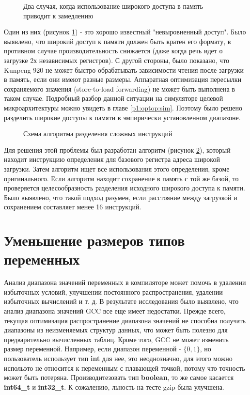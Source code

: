 \begin{figure}[htbp]
	\centering
	
	\caption{Два случая, когда использование широкого доступа в память приводит к замедлению}
	\label{splitsvg1}
\end{figure}

Один из них (рисунок \ref{splitsvg1}) - это хорошо известный "невыровненный доступ". Было выявлено, что широкий доступ к памяти должен быть кратен его формату, в противном случае производительность снижается (даже когда речь идет о загрузке 2х независимых регистров). С другой стороны, было показано, что Kunpeng 920 не может быстро обрабатывать зависимости чтения после загрузки в память, если они имеют разные размеры. Аппаратная оптимизация пересылки сохраняемого значения (store-to-load forwarding) \cite{shen2013modern} не может быть выполнена в таком случае. Подробный разбор данной ситуации на симуляторе целевой микроархитектуры можно увидеть в главе \ref{p1:optop:sim}. Поэтому было решено разделить широкие доступы к памяти в эмпирически установленном диапазоне.



\begin{figure}[htbp]
	\centering
	
	\caption{Схема алгоритма разделения сложных инструкций}
	\label{splitsvg2}
\end{figure}

Для решения этой проблемы был разработан алгоритм (рисунок \ref{splitsvg2}), который находит инструкцию определения для базового регистра адреса широкой загрузки. Затем алгоритм ищет все использования этого определения, кроме оригинального. Если алгоритм находит сохранение в память с той же базой, то проверяется целесообразность разделения исходного широкого доступа к памяти. Было выявлено, что такой подход разумен, если расстояние между загрузкой и сохранением составляет менее 16 инструкций.

 \section {Уменьшение размеров типов переменных}
 Анализ диапазона значений переменных в компиляторе \cite{harrison1977compiler,  simon2008value}  может помочь в удалении избыточных условий, улучшении постоянного распространения, удалении избыточных вычислений и т. д. В результате исследования было выявлено, что анализ диапазона значений GCC все еще имеет недостатки. Прежде всего, текущая оптимизация распространение диапазона значений не способна получать диапазоны из неизменяемых структур данных, что может быть полезно для предварительно вычисленных таблиц. Кроме того, GCC не может изменить размер переменной. Например, если диапазон переменной - $\{0, 1\}$, но пользователь использует тип \textbf{int} для нее, это неоднозначно, для этого можно испольэто не относится к переменным с плавающей точкой, потому что точность может быть потеряна. Производитезовать тип \textbf{boolean}, то же самое касается \textbf{int64\_t} и \textbf{int32\_t}. К сожалению, льность на тесте gzip была улучшена.
 
